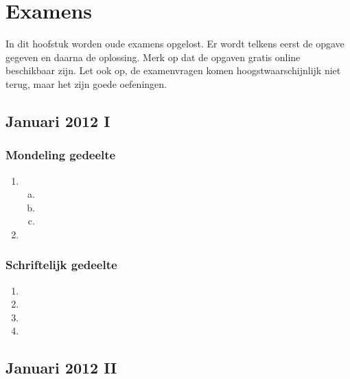 \documentclass[main.tex]{subfiles}
\begin{document}
\chapter{Examens}
\label{cha:examens}
In dit hoofstuk worden oude examens opgelost.
Er wordt telkens eerst de opgave gegeven en daarna de oplossing.
Merk op dat de opgaven gratis online beschikbaar zijn.
Let ook op, de examenvragen komen hoogstwaarschijnlijk niet terug, maar het zijn goede oefeningen.




\section{Januari 2012 I}

\subsection{Mondeling gedeelte}
\begin{enumerate}
\item
  \begin{enumerate}[(a)]
  \item \TODO{}
  \item \TODO{}
  \item \TODO{}
  \end{enumerate}
\item \TODO{}
\end{enumerate}
\subsection{Schriftelijk gedeelte}
\begin{enumerate}
\item













\item \TODO{}
\item \TODO{}
\item \TODO{}
\end{enumerate}



\section{Januari 2012 II}


















\end{document}
